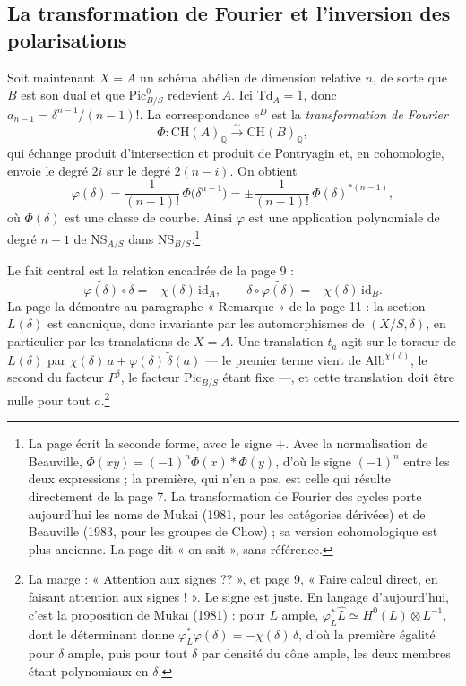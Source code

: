 \documentclass[11pt,a4paper]{article}
\begin{document}
\subsection*{La transformation de Fourier et l'inversion des polarisations}

Soit maintenant $X = A$ un schéma abélien de dimension relative $n$, de sorte
que $B$ est son dual et que $\mathrm{Pic}^{0}_{B/S}$ redevient $A$. Ici
$\mathrm{Td}_A = 1$, donc $a_{n-1} = \delta^{n-1}/(n-1)!$. La correspondance
$e^{D}$ est la \emph{transformation de Fourier}
\[
\Phi : \mathrm{CH}(A)_{\mathbb{Q}} \xrightarrow{\ \sim\ } \mathrm{CH}(B)_{\mathbb{Q}},
\]
qui échange produit d'intersection et produit de Pontryagin et, en
cohomologie, envoie le degré $2i$ sur le degré $2(n - i)$. On obtient
\[
\varphi(\delta) = \frac{1}{(n-1)!}\,\Phi\bigl(\delta^{n-1}\bigr)
= \pm \frac{1}{(n-1)!}\,\Phi(\delta)^{*(n-1)},
\]
où $\Phi(\delta)$ est une classe de courbe. Ainsi $\varphi$ est une
application polynomiale de degré $n - 1$
de $\mathrm{NS}_{A/S}$ dans $\mathrm{NS}_{B/S}$.\footnote{La page écrit la
seconde forme, avec le signe $+$. Avec la normalisation de Beauville,
$\Phi(xy) = (-1)^{n}\Phi(x) * \Phi(y)$, d'où le signe $(-1)^{n}$ entre les
deux expressions ; la première, qui n'en a pas, est celle qui résulte
directement de la page 7. La transformation de Fourier des cycles porte
aujourd'hui les noms de Mukai (1981, pour les catégories dérivées) et de
Beauville (1983, pour les groupes de Chow) ; sa version cohomologique est plus
ancienne. La page dit « on sait », sans référence.}

Le fait central est la relation encadrée de la page 9 :
\[
\boxed{\;\widetilde{\varphi(\delta)} \circ \tilde{\delta} = -\chi(\delta)\,\mathrm{id}_A,
\qquad
\tilde{\delta} \circ \widetilde{\varphi(\delta)} = -\chi(\delta)\,\mathrm{id}_B .\;}
\]
La page la démontre au paragraphe « Remarque » de la page 11 : la section
$L(\delta)$ est canonique, donc invariante par les automorphismes de
$(X/S, \delta)$, en particulier par les translations de $X = A$. Une
translation $t_a$ agit sur le torseur de $L(\delta)$ par
$\chi(\delta)\,a + \widetilde{\varphi(\delta)}\,\tilde{\delta}(a)$ — le premier
terme vient de $\mathrm{Alb}^{\chi(\delta)}$, le second du facteur
$P^{\delta}$, le facteur $\mathrm{Pic}_{B/S}$ étant fixe —, et cette
translation doit être nulle pour tout $a$.\footnote{La marge : « Attention aux
signes ?? », et page 9, « Faire calcul direct, en faisant attention aux
signes ! ». Le signe est juste. En langage d'aujourd'hui, c'est la
proposition de Mukai (1981) : pour $L$ ample, $\varphi_L^{*}\widehat{L} \simeq
H^{0}(L) \otimes L^{-1}$, dont le déterminant donne
$\varphi_L^{*}\varphi(\delta) = -\chi(\delta)\,\delta$, d'où la première
égalité pour $\delta$ ample, puis pour tout $\delta$ par densité du cône
ample, les deux membres étant polynomiaux en $\delta$.}
\end{document}
